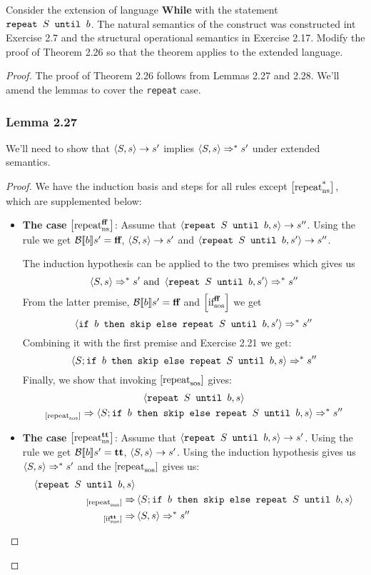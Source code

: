 Consider the extension of language \textbf{While} with the statement $\srepeat{S}{b}$. The natural semantics of the construct was constructed int Exercise 2.7 and the structural operational semantics in Exercise 2.17. Modify the proof of Theorem 2.26 so that the theorem applies to the extended language.
\begin{proof}
The proof of Theorem 2.26  follows from Lemmas 2.27 and 2.28. We'll amend the lemmas to cover the \texttt{repeat} case.
\subsubsection*{Lemma 2.27}
We'll need to show that $\nstrans{S}{s}{s^\prime}$ implies $\sosftrans[*]{S}{s}{s^\prime}$ under extended semantics.
\begin{proof}
We have the induction basis and steps for all rules except $\nsrule[*]{repeat}$, which are supplemented below:
\begin{itemize}
	\item \textbf{The case} $\nsrule[\false]{repeat}$: Assume that $\nstrans{\srepeat{S}{b}}{s}{s^\pprime}$.
	Using the rule we get $\beval{b}{s^\prime}=\false$, $\nstrans{S}{s}{s^\prime}$ and $\nstrans{\srepeat{S}{b}}{s^\prime}{s^\pprime}$.

	The induction hypothesis can be applied to the two premises which gives us
	\begin{equation*}
		\sosftrans[*]{S}{s}{s^\prime} \text{ and } \sosftrans[*]{\srepeat{S}{b}}{s^\prime}{s^\pprime}
	\end{equation*}
	From the latter premise, $\beval{b}{s^\prime}=\false$ and $\sosrule[\false]{if}$ we get
	\begin{equation*}
		\sosftrans[*]{\sif{b}{\sskip}{\srepeat{S}{b}}}{s^\prime}{s^\pprime}
	\end{equation*}
	Combining it with the first premise and Exercise 2.21 we get:
	\begin{equation*}
		\sosftrans[*]{S;\sif{b}{\sskip}{\srepeat{S}{b}}}{s}{s^\pprime}
	\end{equation*}
	Finally, we show that invoking $\sosrule{repeat}$ gives:
	\begin{multline*}
		\state{\srepeat{S}{b}}{s} \\ {}_{\sosrule{repeat}}\Rightarrow  \sosftrans[*]{S;\sif{b}{\sskip}{\srepeat{S}{b}}}{s}{s^\pprime}
	\end{multline*}
	\item \textbf{The case} $\nsrule[\true]{repeat}$: Assume that $\nstrans{\srepeat{S}{b}}{s}{s^\prime}$.
	Using the rule we get $\beval{b}{s^\prime}=\true$, $\nstrans{S}{s}{s^\prime}$. Using the induction hypothesis gives us $\sosftrans[*]{S}{s}{s^\prime}$ and the $\sosrule{repeat}$ gives us:
	\begin{align*}
		\state{\srepeat{S}{b}}{s} & \\
		{}_{\sosrule{repeat}}\Rightarrow & \state{S;\sif{b}{\sskip}{\srepeat{S}{b}}}{s}  \\ 
		{}_{\sosrule[\true]{if}}\Rightarrow &	\sosftrans[*]{S}{s}{s^\pprime}
	\end{align*}
\end{itemize}
\end{proof}

\end{proof}
